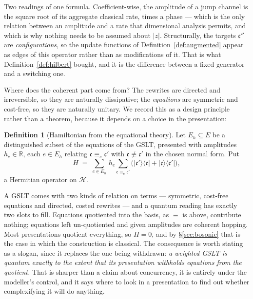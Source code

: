 \documentclass[11pt,a4paper]{article}
\theoremstyle{plain}
\theoremstyle{definition}
\newtheorem{definition}[theorem]{Definition}
\theoremstyle{remark}
\begin{document}
Two readings of one formula. Coefficient-wise, the amplitude of a jump channel is the square root of
its aggregate classical rate, times a phase --- which is the only relation between an amplitude and a
rate that dimensional analysis permits, and which is why nothing needs to be assumed about $|z|$.
Structurally, the targets $\mathfrak{c}''$ are \emph{configurations}, so the update functions of
Definition~\ref{def:augmented} appear as edges of this operator rather than as modifications of it.
That is what Definition~\ref{def:hilbert} bought, and it is the difference between a fixed generator
and a switching one.

Where does the coherent part come from? The rewrites are directed and irreversible, so they are
naturally dissipative; the \emph{equations} are symmetric and cost-free, so they are naturally
unitary. We record this as a design principle rather than a theorem, because it depends on a choice
in the presentation:

\begin{definition}[Hamiltonian from the equational theory]
\label{def:hamiltonian}
Let $E_h \subseteq E$ be a distinguished subset of the equations of the GSLT, presented with
amplitudes $h_e \in \mathbb{R}$, each $e \in E_h$ relating $\mathfrak{c} \equiv_e \mathfrak{c}'$ with
$\mathfrak{c} \not\equiv \mathfrak{c}'$ in the chosen normal form. Put
\[
H \;=\; \sum_{e \in E_h}\, h_e \!\!\sum_{\mathfrak{c} \equiv_e \mathfrak{c}'}\!\! \big(|\mathfrak{c}'\rangle\langle \mathfrak{c}| + |\mathfrak{c}\rangle\langle \mathfrak{c}'|\big),
\]
a Hermitian operator on $\mathcal{H}$.
\end{definition}

A GSLT comes with two kinds of relation on terms --- symmetric, cost-free equations and directed,
costed rewrites --- and a quantum reading has exactly two slots to fill. Equations quotiented into
the basis, as $\equiv$ is above, contribute nothing; equations left un-quotiented and given
amplitudes are coherent hopping. Most presentations quotient everything, so $H = 0$, and by
\S\ref{sec:bosonic} that is the case in which the construction is classical. The consequence is worth
stating as a slogan, since it replaces the one being withdrawn: \emph{a weighted GSLT is quantum
exactly to the extent that its presentation withholds equations from the quotient.} That is sharper
than a claim about concurrency, it is entirely under the modeller's control, and it says where to
look in a presentation to find out whether complexifying it will do anything.
\end{document}
